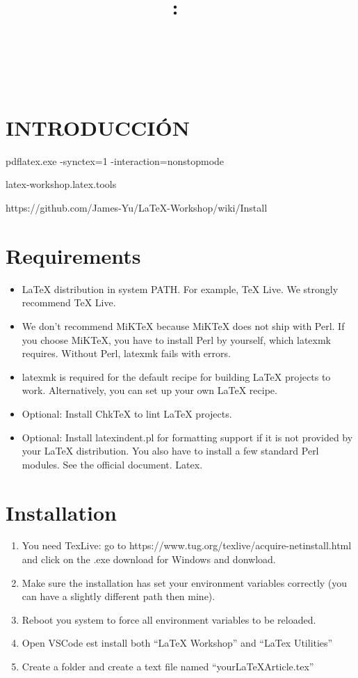 \documentclass[letterpaper,12pt]{extarticle}
\title{
\centering{\texttt{[image: GN\_logo.png]}}\\
\vspace{2in}
\textmd{\textbf{\hmwkClass:\ \hmwkTitle}}\\
\normalsize\vspace{0.1in}\small{\hmwkDueDate}\\
\vspace{0.1in}\large{\textit{\hmwkClassInstructor\ \hmwkClassTime}}
\vspace{2in}
}
\author{\textbf{\hmwkAuthorName}}
\date{} %
\begin{document}
\section{INTRODUCCIÓN}

pdflatex.exe -synctex=1 -interaction=nonstopmode %

latex-workshop.latex.tools

https://github.com/James-Yu/LaTeX-Workshop/wiki/Install

\section{Requirements}
\begin{itemize}
  \item LaTeX distribution in system PATH. For example, TeX Live. We strongly recommend TeX Live.
  \item We don't recommend MiKTeX because MiKTeX does not ship with Perl. If you choose MiKTeX, you have to install Perl by yourself, which latexmk requires. Without Perl, latexmk fails with errors.
  \item latexmk is required for the default recipe for building LaTeX projects to work. Alternatively, you can set up your own LaTeX recipe.
  \item Optional: Install ChkTeX to lint LaTeX projects.
  \item Optional: Install latexindent.pl for formatting support if it is not provided by your LaTeX distribution. You also have to install a few standard Perl modules. See the official document. Latex.
\end{itemize}

\section{Installation}

\begin{enumerate}
  \item You need TexLive: go to https://www.tug.org/texlive/acquire-netinstall.html and click on the .exe download for Windows and donwload.
  \item Make sure the installation has set your environment variables correctly (you can have a slightly different path then mine).
  \item Reboot you system to force all environment variables to be reloaded.
  \item Open VSCode est install both “LaTeX Workshop” and “LaTex Utilities”
  \item Create a folder and create a text file named “yourLaTeXArticle.tex”
\end{enumerate}
\end{document}
